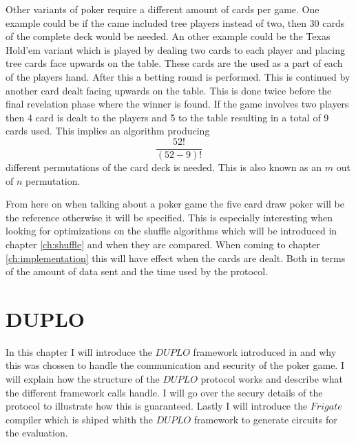 \documentclass[twoside,11pt,openright]{report}
\begin{document}
Other variants of poker require a different amount of cards per game. One example could be if the came included tree players instead of two, then 30 cards of the complete deck would be needed. An other example could be the Texas Hold'em variant which is played by dealing two cards to each player and placing tree cards face upwards on the table. These cards are the used as a part of each of the players hand. After this a betting round is performed. This is continued by another card dealt facing upwards on the table. This is done twice before the final revelation phase where the winner is found. If the game involves two players then 4 card is dealt to the players and 5 to the table resulting in a total of 9 cards used. This implies an algorithm producing $$\frac{52!}{(52-9)!}$$ different permutations of the card deck is needed. This is also known as an $m$ out of $n$ permutation.

From here on when talking about a poker game the five card draw poker will be the reference otherwise it will be specified. This is especially interesting when looking for optimizations on the shuffle algorithms which will be introduced in chapter \ref{ch:shuffle} and when they are compared. When coming to chapter \ref{ch:implementation} this will have effect when the cards are dealt. Both in terms of the amount of data sent and the time used by the protocol.


\chapter{DUPLO}
\label{ch:duplo}

In this chapter I will introduce the $DUPLO$ framework introduced in  and why this was chossen to handle the communication and security of the poker game. I will explain how the structure of the $DUPLO$ protocol works and describe what the different framework calls handle. I will go over the secury details of the protocol to illustrate how this is guaranteed. Lastly I will introduce the $Frigate$ compiler which is shiped whith the $DUPLO$ framework to generate circuits for the evaluation.

\bigskip
\end{document}
